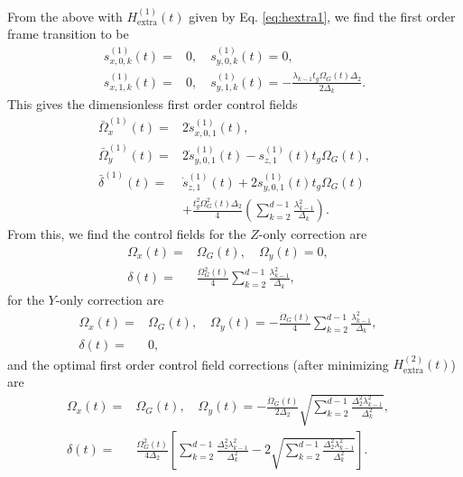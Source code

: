\documentclass[pra,twocolumn,floatfix,superscriptaddress,eqsecnum]{revtex4-1}
\begin{document}
From the above with  $H_\mathrm{extra}^{(1)}(t)$ given by Eq. \eqref{eq:hextra1}, we find the first order frame transition to be
\begin{equation}
\begin{split}
  s^{(1)}_{x,0,k}(t) = &0,\quad s^{(1)}_{y,0,k}(t) =0,\\ s^{(1)}_{x,1,k}(t) = &0,\quad s^{(1)}_{y,1,k} (t)= -\frac{\lambda_{k-1} t_g\Omega_{G}(t)\Delta_{2}}{2\Delta_k}.
\end{split}
\end{equation}
 This gives the dimensionless first order control fields
\begin{equation}
\begin{split}
\bar\Omega_{x}^{(1)} (t) =&  2\dot{s}^{(1)}_{x,0,1} (t) ,\\
 \bar\Omega_{y}^{(1)}(t) =&   2 \dot{s}^{(1)}_{y,0,1} (t)-s^{(1)}_{z,1} (t)t_g\Omega_G (t),\\
  \bar\delta^{(1)} (t) = &\dot{s}^{(1)}_{z,1}(t) + 2 s^{(1)}_{y,0,1}(t)t_g\Omega_G(t) \\&+ \frac{t_g^2\Omega_G^2(t)\Delta_{2}}{4}{\textstyle{\left(\sum_{k=2}^{d-1}\frac{\lambda_{k-1}^2}{\Delta_{k}} \right).}}
  \end{split}
\end{equation}
From this, we find the control fields for the $Z$-only correction are 
\begin{equation}
\begin{split}
\Omega_{x}(t) = &  \Omega_G(t) ,\quad
\Omega_{y}(t) =  0,\quad\\
\delta(t) =& \frac{ \Omega_G^2(t)}{4}{\textstyle{\sum_{k=2}^{d-1}\frac{\lambda_{k-1}^2}{\Delta_{k}},}}
  \end{split}
\end{equation}
for the $Y$-only correction are
\begin{equation}
\begin{split}
\Omega_{x}(t) = &  \Omega_G(t) ,\quad
\Omega_{y}(t) =  -\frac{\dot\Omega_G(t)}{4}{\textstyle{\sum_{k=2}^{d-1}\frac{\lambda_{k-1}^2}{\Delta_{k}} ,}}\quad\\
\delta(t) =& 0,
  \end{split}
\end{equation}
and the optimal first order control field corrections (after minimizing  $H_\mathrm{extra}^{(2)}(t)$) are
\begin{equation}
\begin{split}
\Omega_{x}(t) = &  \Omega_G(t) ,\quad
\Omega_{y}(t) =  -\frac{\dot\Omega_G(t)}{2\Delta_2}{\textstyle{\sqrt{\sum_{k=2}^{d-1}\frac{\Delta_{2}^2\lambda_{k-1}^2}{\Delta_{k}^2}},}}\quad\\
\delta(t) =& \frac{ \Omega_G^2(t)}{4\Delta_2}{\textstyle{\left[\sum_{k=2}^{d-1}\frac{\Delta_{2}^2\lambda_{k-1}^2}{\Delta_{k}^2}-2\sqrt{\sum_{k=2}^{d-1}\frac{\Delta_{2}^2\lambda_{k-1}^2}{\Delta_{k}^2}} \right].}}
  \end{split}
\end{equation}
\end{document}
